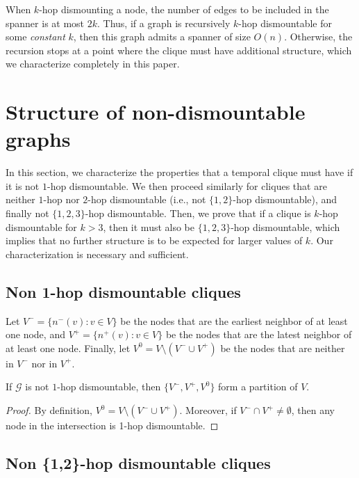 \documentclass[USenglish, a4paper, thm-restate,numberwithinsect, cleveref]{lipics-v2021}
\newcommand{\G}{\ensuremath{\mathcal{G}}\xspace}
\begin{document}
When $k$-hop dismounting a node, the number of edges to be included in the spanner is at most $2k$. Thus, if a graph is recursively $k$-hop dismountable for some \emph{constant} $k$, then this graph admits a spanner of size $O(n)$. Otherwise, the recursion stops at a point where the clique must have additional structure, which we characterize completely in this paper.


\section{Structure of non-dismountable graphs}
\label{sec:non-dismountability}

In this section, we characterize the properties that a temporal clique must have if it is not $1$-hop dismountable. We then proceed similarly for cliques that are neither $1$-hop nor $2$-hop dismountable (i.e., not $\{1,2\}$-hop dismountable), and finally not $\{1,2,3\}$-hop dismountable. Then, we prove that if a clique is $k$-hop dismountable for $k>3$, then it must also be $\{1,2,3\}$-hop dismountable, which implies that no further structure is to be expected for larger values of $k$. Our characterization is necessary and sufficient.


\subsection{Non 1-hop dismountable cliques}

Let $V^-=\{n^-(v) : v\in V\}$ be the nodes that are the earliest neighbor of at least one node, and $V^+=\{n^+(v) : v\in V\}$ be the nodes that are the latest neighbor of at least one node. Finally, let $V^0=V\setminus (V^- \cup V^+)$ be the nodes that are neither in $V^-$ nor in $V^+$.


\begin{lemma}
  If $\G$ is not $1$-hop dismountable, then $\{V^-, V^+, V^0\}$ form a partition of $V$.
\end{lemma}
\begin{proof}
  By definition, $V^0 = V \setminus (V^- \cup V^+)$. Moreover, if $V^- \cap V^+ \ne \emptyset$, then any node in the intersection is 1-hop dismountable.
\end{proof}

\subsection{Non \{1,2\}-hop dismountable cliques}
\end{document}

